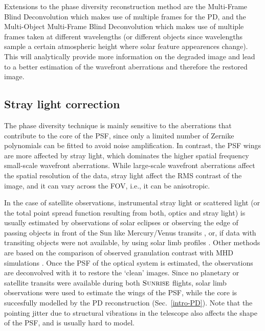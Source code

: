 \documentclass[goettingen, gauss, print]{thesis}
\begin{document}
Extensions to the phase diversity reconstruction method are the Multi-Frame Blind Deconvolution \citep[MFBD;][]{lofdahl_phase_1996} which makes use of multiple frames for the PD, and the Multi-Object Multi-Frame Blind Deconvolution \citep[MOMFBD;][]{van_noort_solar_2005} which makes use of multiple frames taken at different wavelengths (or different objects since wavelengths sample a certain atmospheric height where solar feature appearences change). This will analytically provide more information on the degraded image and lead to a better estimation of the wavefront aberrations and therefore the restored image.
\newpage
\subsection{Stray light correction}
\label{intro-SL}

The phase diversity technique is mainly sensitive to the aberrations that contribute to the core of the PSF, since only a limited number of Zernike polynomials can be fitted to avoid noise amplification. In contrast, the PSF wings are more affected by stray light, which dominates the higher spatial frequency small-scale wavefront aberrations. While large-scale wavefront aberrations affect the spatial resolution of the data, stray light affect the RMS contrast of the image, and it can vary across the FOV, i.e., it can be anisotropic.

In the case of satellite observations, instrumental stray light or scattered light (or the total point spread function resulting from both, optics and stray light) is usually estimated by observations of solar eclipses \citep{deubner_new_1975} or observing the edge of passing objects in front of the Sun like Mercury/Venus transits \citep{wedemeyer-bohm_point_2008, wedemeyer-bohm_continuum_2009, mathew_stray_2009, yeo_point_2014}, or, if data with transiting objects were not available, by using solar limb profiles \citep{mathew_properties_2007}. Other methods are based on the comparison of observed granulation contrast with MHD simulations \citep{danilovic_intensity_2008, afram_intensity_2011}. Once the PSF of the optical system is estimated, the observations are deconvolved with it to restore the `clean' images. Since no planetary or satellite transits were available during both $\textsc{Sunrise}$ flights, solar limb observations were used to estimate the wings of the PSF, while the core is succesfully modelled by the PD reconstruction (Sec.~\ref{intro-PD}). Note that the pointing jitter due to structural vibrations in the telescope also affects the shape of the PSF, and is usually hard to model.
\end{document}
